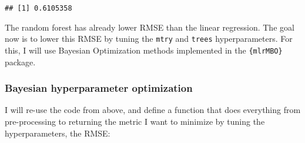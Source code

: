 \documentclass[
]{article}
\newenvironment{Shaded}{\begin{snugshade}}{\end{snugshade}}
\newcommand{\ControlFlowTok}[1]{\textcolor[rgb]{0.13,0.29,0.53}{\textbf{#1}}}
\newcommand{\DataTypeTok}[1]{\textcolor[rgb]{0.13,0.29,0.53}{#1}}
\newcommand{\DecValTok}[1]{\textcolor[rgb]{0.00,0.00,0.81}{#1}}
\newcommand{\KeywordTok}[1]{\textcolor[rgb]{0.13,0.29,0.53}{\textbf{#1}}}
\newcommand{\NormalTok}[1]{#1}
\newcommand{\OperatorTok}[1]{\textcolor[rgb]{0.81,0.36,0.00}{\textbf{#1}}}
\newcommand{\StringTok}[1]{\textcolor[rgb]{0.31,0.60,0.02}{#1}}
\begin{document}
\begin{verbatim}
## [1] 0.6105358
\end{verbatim}

The random forest has already lower RMSE than the linear regression. The goal now is to lower this
RMSE by tuning the \texttt{mtry} and \texttt{trees} hyperparameters. For this, I will use Bayesian Optimization
methods implemented in the \texttt{\{mlrMBO\}} package.

\hypertarget{bayesian-hyperparameter-optimization}{%
\subsubsection{Bayesian hyperparameter optimization}\label{bayesian-hyperparameter-optimization}}

I will re-use the code from above, and define a function that does everything from pre-processing
to returning the metric I want to minimize by tuning the hyperparameters, the RMSE:

\begin{Shaded}
\end{Shaded}
\end{document}
